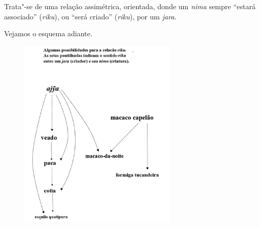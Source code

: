 Trata"-se de uma relação assimétrica, orientada, donde um \emph{nima}
sempre ``estará associado'' (\emph{riku}), ou ``será criado''
(\emph{riku}), por um \emph{jara}.

Vejamos o esquema adiante.

\begin{figure}[H]
\centering
  \includegraphics[width=75mm]{./imgs/Figura_11_crop}
\end{figure}


